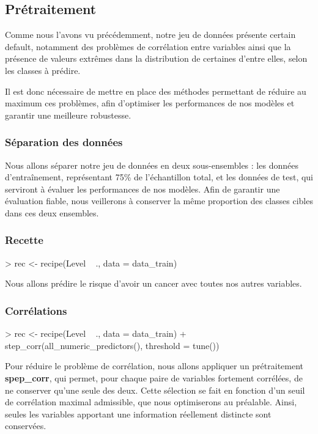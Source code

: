 \documentclass[a4paper,11pt]{article}
\begin{document}
\subsection{Prétraitement}

Comme nous l’avons vu précédemment, notre jeu de données présente certain default, notamment des problèmes de corrélation entre variables ainsi que la présence de valeurs extrêmes dans la distribution de certaines d’entre elles, selon les classes à prédire.

Il est donc nécessaire de mettre en place des méthodes permettant de réduire au maximum ces problèmes, afin d’optimiser les performances de nos modèles et garantir une meilleure robustesse.

\subsubsection{Séparation des données}

Nous allons séparer notre jeu de données en deux sous-ensembles : les données d’entraînement, représentant 75\% de l’échantillon total, et les données de test, qui serviront à évaluer les performances de nos modèles.  
Afin de garantir une évaluation fiable, nous veillerons à conserver la même proportion des classes cibles dans ces deux ensembles.


\subsubsection{Recette}

\begin{Schunk}
\begin{Sinput}
> rec <- recipe(Level ~ ., data = data_train)
\end{Sinput}
\end{Schunk}
Nous allons prédire le risque d'avoir un cancer avec toutes nos autres variables.

\subsubsection{Corrélations}

\begin{Schunk}
\begin{Sinput}
> rec <- recipe(Level ~ ., data = data_train) %>%
+   step_corr(all_numeric_predictors(), threshold = tune())
\end{Sinput}
\end{Schunk}


Pour réduire le problème de corrélation, nous allons appliquer un prétraitement \textbf{spep\_corr}, qui permet, pour chaque paire de variables fortement corrélées, de ne conserver qu’une seule des deux.  
Cette sélection se fait en fonction d’un seuil de corrélation maximal admissible, que nous optimiserons au préalable. Ainsi, seules les variables apportant une information réellement distincte sont conservées.
\end{document}
